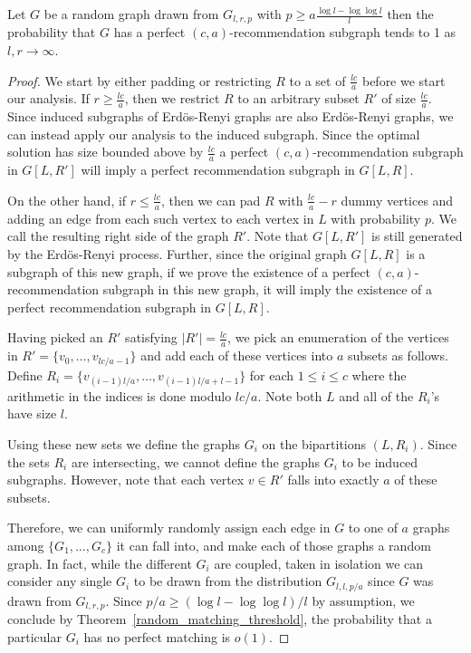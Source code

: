 \begin{thm}\label{perfect}
Let $G$ be a random graph drawn from $G_{l, r, p}$ with $p\geq a\frac{\log l-\log\log
l}{l}$ then the probability that $G$ has a perfect $(c, a)$-recommendation
subgraph tends to 1 as $l,r\to\infty$.
\end{thm}

\begin{proof}
We start by either padding or restricting $R$ to a set of $\frac{lc}{a}$ before we
start our analysis. If $r\geq\frac{lc}{a}$, then we restrict $R$
to an arbitrary subset $R'$ of size $\frac{lc}{a}$. Since induced subgraphs of
Erd\"{o}s-Renyi graphs are also Erd\"{o}s-Renyi graphs, we can instead
apply our analysis to the induced subgraph. Since the optimal
solution has size bounded above by $\frac{lc}{a}$ a perfect $(c,a)$-recommendation
subgraph in $G[L,R']$ will imply a perfect recommendation subgraph in $G[L,R]$. \vs

On the other hand, if $r \leq\frac{lc}{a}$, then we can pad $R$ with $\frac{lc}{a}-r$ 
dummy vertices and adding an edge from each such vertex to each vertex in $L$
with probability $p$. We call the resulting right side of the graph $R'$.
Note that $G[L,R']$ is still generated by the Erd\"{o}s-Renyi process. Further,
since the original graph $G[L,R]$ is a subgraph of this new graph, if we prove
the existence of a perfect $(c,a)$-recommendation subgraph in this new graph, it
will imply the existence of a perfect recommendation subgraph in $G[L,R]$. \vs

Having picked an $R'$ satisfying $|R'|=\frac{lc}{a}$, we pick an enumeration 
of the vertices in $R'=\{v_0,\ldots, v_{lc/a-1}\}$
and add each of these vertices into $a$ subsets as follows. Define
$R_i = \{v_{(i-1)l/a}, \ldots, v_{(i-1)l/a+l-1}\}$ for each $1\leq i\leq c$ where
the arithmetic in the indices is done modulo $lc/a$. Note both $L$ and all of
the $R_i$'s have size $l$. \vs

Using these new sets we define the graphs $G_i$ on the bipartitions
$(L, R_i)$. Since the sets $R_i$ are intersecting, we cannot define the
graphs $G_i$ to be induced subgraphs. However, note that each vertex $v\in R'$
falls into exactly $a$ of these subsets. \vs

Therefore, we can uniformly randomly assign each edge in $G$ to one of $a$ graphs among $\{G_1,\ldots, G_c\}$ it can fall into,
and make each of those graphs a random graph. In fact, while the different
$G_i$ are coupled, taken in isolation we can consider any single $G_i$ to be
drawn from the distribution $G_{l,l,p/a}$ since $G$ was drawn from $G_{l,r,p}$.
Since $p/a \geq (\log l - \log\log l)/l$ by assumption, we conclude by
Theorem~\ref{random_matching_threshold}, the probability that a particular
$G_i$ has no perfect matching is $o(1)$. \vs


\end{proof}

